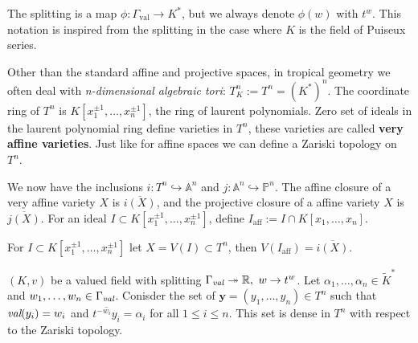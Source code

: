     The splitting is a map $\phi: \Gamma_{\text{val}} \to K^{*}$, but we always denote $\phi(w)$ with $t^w$. This notation is inspired from the splitting in the case where $K$ is the field of Puiseux series.
    \par Other than the standard affine and projective spaces, in tropical geometry we often deal with \textit{n-dimensional algebraic tori}: $T^{n}_{K} := T^n = (K^{*})^n$. 
    The coordinate ring of $T^{n}$ is $K[x_{1}^{\pm 1},\dots,x_{n}^{\pm 1}]$, the ring of laurent polynomials. 
    Zero set of ideals in the laurent polynomial ring define varieties in $T^n$, these varieties are called \textbf{very affine varieties}.
    Just like for affine spaces we can define a Zariski topology on $T^{n}$.
    \par We now have the inclusions $i: T^{n} \hookrightarrow \mathbb{A}^n$ and $j: \mathbb{A}^{n} \hookrightarrow \mathbb{P}^{n}$. 
    The affine closure of a very affine variety $X$ is $\overline{i(X)}$, and the projective closure of a affine variety $X$ is $\overline{j(X)}$. 
    For an ideal $I \subset K[x_{1}^{\pm 1},\dots,x_{n}^{\pm 1}]$, define $I_{\text{aff}}:= I \cap K[x_{1},\dots,x_{n}]$.

    \begin{proposition}
        For $I \subset K[x_{1}^{\pm 1},\dots,x_{n}^{\pm 1}]$ let $X = V(I) \subset T^n$, then $V(I_{\text{aff}}) = \overline{i(X)}$.
    \end{proposition}

    \begin{proposition}
        \label{densenessprop}
        $(K,v)$ be a valued field with splitting $\Gamma_{\emph{val}} \twoheadrightarrow \mathbb{R},~w \to t^{w}$.
        Let $\alpha_{1}, \dots,\alpha_{n} \in \tilde{K}^{*}$ and $w_1, \dots, w_n \in \Gamma_{\emph{val}}$. 
        Conisder the set of $\textbf{y} = (y_1, \dots, y_n) \in T^{n}$ such that $\emph{val}(y_{i}) = w_{i}$ and $\overline{t^{-w_i}y_i} = \alpha_{i}$ for all $1\leq i \leq n$.
        This set is dense in $T^n$ with respect to the Zariski topology.
    \end{proposition}

